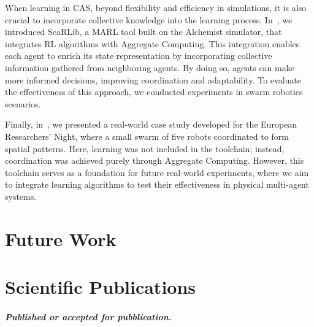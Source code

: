 \documentclass[12pt]{article}
\begin{document}
When learning in CAS, beyond flexibility and efficiency in simulations, it is also crucial to incorporate 
 collective knowledge into the learning process. 
% 
In~\cite{DBLP:conf/coordination/DominiCAV23,DBLP:journals/scp/DominiCAV24}, we introduced ScaRLib, a MARL tool built on the Alchemist simulator, 
 that integrates RL algorithms with Aggregate Computing.
%
This integration enables each agent to enrich its state representation by incorporating collective information gathered from neighboring agents. 
%
By doing so, agents can make more informed decisions, improving coordination and adaptability.
% 
To evaluate the effectiveness of this approach, we conducted experiments in swarm robotics scenarios.

Finally, in~\cite{DBLP:conf/coordination/AguzziNDR25}, we presented a real-world case study developed for the 
 European Researchers' Night, where a small swarm of five robots coordinated to form spatial patterns.
%
Here, learning was not included in the toolchain; instead, coordination was achieved purely through Aggregate Computing. 
%
However, this toolchain serves as a foundation for future real-world experiments, where we aim to integrate learning algorithms 
 to test their effectiveness in physical multi-agent systems.

\section{Future Work}\label{sec:future}


\section{Scientific Publications}\label{sec:pubblications}

\sloppypar
\paragraph{\emph{Published or accepted for pubblication.}}
\end{document}
